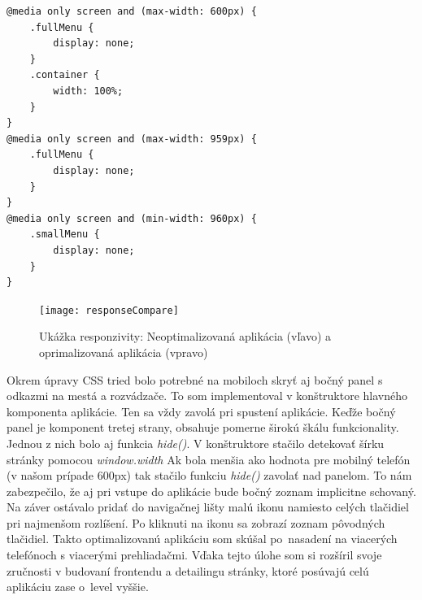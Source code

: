\documentclass[11pt, oneside]{report}
\begin{document}
\begin{lstlisting}[language=html5,showstringspaces=false, caption= CSS optimalizácia pre jednotlivé rozlíšenia,captionpos=b]
@media only screen and (max-width: 600px) {
	.fullMenu {
        display: none;
    }
	.container {
        width: 100%;
    }
}
@media only screen and (max-width: 959px) {
    .fullMenu {
        display: none;
    }
}
@media only screen and (min-width: 960px) {
    .smallMenu {
        display: none;
    }
}
\end{lstlisting}
\begin{figure}[H]
    \centering
    \texttt{[image: responseCompare]}
    \caption{Ukážka responzivity: Neoptimalizovaná aplikácia (vľavo) a oprimalizovaná aplikácia (vpravo) }
    \label{fig:responseCompare}
\end{figure}
Okrem úpravy CSS tried bolo potrebné na mobiloch skryť aj  bočný panel s  odkazmi na mestá a rozvádzače. To som  implementoval v konštruktore hlavného komponenta  aplikácie. Ten sa vždy zavolá pri spustení aplikácie. Keďže bočný panel je komponent tretej strany, obsahuje  pomerne širokú škálu  funkcionality. Jednou z nich bolo aj funkcia \textit{hide()}. V konštruktore  stačilo detekovať šírku stránky pomocou \textit{window.width} Ak bola menšia ako  hodnota pre mobilný telefón (v našom prípade 600px) tak stačilo funkciu \textit{hide()} zavolať nad panelom. To nám zabezpečilo, že aj  pri vstupe do aplikácie bude bočný zoznam implicitne schovaný. Na záver ostávalo pridať do navigačnej lišty malú ikonu namiesto celých tlačidiel pri najmenšom rozlíšení. Po kliknuti na ikonu sa zobrazí zoznam pôvodných tlačidiel. Takto optimalizovanú aplikáciu som skúšal po~nasadení na viacerých telefónoch s viacerými prehliadačmi. Vďaka tejto úlohe som si rozšíril  svoje zručnosti v budovaní frontendu a  detailingu stránky, ktoré posúvajú celú aplikáciu zase o~level vyššie.
\newpage
\end{document}
